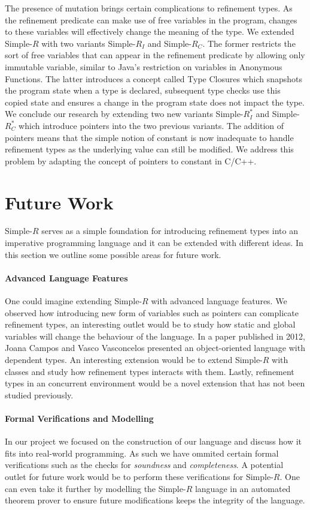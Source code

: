 \documentclass[a4paper,12pt]{report}
\begin{document}
\par
The presence of mutation brings certain complications to refinement types. As 
the refinement predicate can make use of free variables in the program, changes 
to these variables will effectively change the meaning of the type. We extended 
Simple-$R$ with two variants Simple-$R_I$ and Simple-$R_C$. The former restricts 
the sort of free variables that can appear in the refinement predicate by allowing 
only immutable variable, similar to Java's restriction on variables in Anonymous 
Functions. The latter introduces a concept called Type Closures which snapshots 
the program state when a type is declared, subsequent type checks use this copied 
state and ensures a change in the program state does not impact the type. We 
conclude our research by extending two new variants Simple-$R^{*}_{I}$ and 
Simple-$R^{*}_{C}$ which introduce pointers into the two previous variants. The 
addition of pointers means that the simple notion of constant is now inadequate 
to handle refinement types as the underlying value can still be modified. We 
address this problem by adapting the concept of pointers to constant in C/C++.

\section{Future Work}
Simple-$R$ serves as a simple foundation for introducing refinement types 
into an imperative programming language and it can be extended with 
different ideas. In this section we outline some possible areas for future work. 

\paragraph{Advanced Language Features} One could imagine extending Simple-$R$ 
with advanced language features. We observed how introducing new form of 
variables such as pointers can complicate refinement types, an interesting 
outlet would be to study how static and global variables will change the 
behaviour of the language. In a paper \cite{objOritentedDependentType} published 
in 2012, Joana Campos and Vasco Vasconcelos presented an 
object-oriented language with dependent types. An interesting extension would be to extend Simple-$R$ 
with classes and study how refinement types interacts with them. Lastly, 
refinement types in an concurrent environment would be a novel extension that 
has not been studied previously. 

\paragraph{Formal Verifications and Modelling} In our project we focused on the construction 
of our language and discuss how it fits into real-world programming. As such we 
have ommited certain formal verifications such as the checks for \emph{soundness} 
and \emph{completeness}. A potential outlet for future work would be to 
perform these verifications for Simple-$R$. One can even take it further 
by modelling the Simple-$R$ language in an automated theorem prover to 
ensure future modifications keeps the integrity of the language. 
\end{document}

